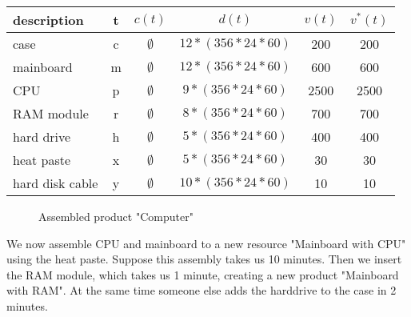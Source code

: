 \documentclass[11pt]{article}
\begin{document}
\begin{center}
  \begin{tabular}{ l | c | c | c | c | c }
    \hline
    description & t & $c(t)$ & $d(t)$ & $v(t)$ & $v^*(t)$ \\ \hline
    case & c & $\emptyset$ & $12*(356*24*60)$ & 200 & 200\\ \hline
    mainboard & m & $\emptyset$ & $12*(356*24*60)$ & 600 & 600\\ \hline
    CPU & p & $\emptyset$ & $9*(356*24*60)$ & 2500 & 2500\\ \hline
    RAM module & r & $\emptyset$ & $8*(356*24*60)$ & 700 & 700\\ \hline
    hard drive & h & $\emptyset$ & $5*(356*24*60)$ & 400 & 400\\ \hline
    heat paste & x & $\emptyset$ & $5*(356*24*60)$ & 30 & 30\\ \hline
    hard disk cable & y & $\emptyset$ & $10*(356*24*60)$ & 10 & 10\\ \hline
   
    \hline
  \end{tabular}
\end{center}


\begin{figure}
\caption{Assembled product "Computer"}
\end{figure}

We now assemble CPU and mainboard to a new resource "Mainboard with CPU" using the heat paste. Suppose this assembly takes us 10 minutes. Then we insert the RAM module, which takes us 1 minute, creating a new product "Mainboard with RAM". At the same time someone else adds the harddrive to the case in 2 minutes.
\end{document}
